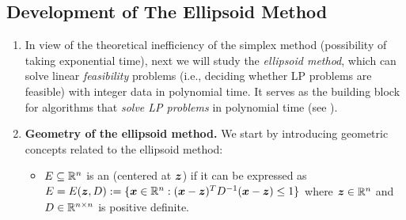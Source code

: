 \subsection{Development of The Ellipsoid Method}
\begin{enumerate}
\item In view of the theoretical inefficiency of the simplex method
(possibility of taking exponential time), next we will study the
\emph{ellipsoid method}, which can solve linear \emph{feasibility} problems
(i.e., deciding whether LP problems are feasible) with integer data in
polynomial time. It serves as the building block for algorithms that
\emph{solve LP problems} in polynomial time (see ).

\item\label{it:ellip-method-geo} \textbf{Geometry of the ellipsoid method.} We start by introducing
geometric concepts related to the ellipsoid method:
\begin{itemize}
\item \(E\subseteq \mathbb{R}^n\) is an  (centered at \(\bm{z}\)) if it can be expressed as
\(E=E(\bm{z},D):=\{\bm{x}\in\mathbb{R}^n:(\bm{x}-\bm{z})^{T}D^{-1}(\bm{x}-\bm{z})\le 1\}\)
where \(\bm{z}\in\mathbb{R}^n\) and \(D\in\mathbb{R}^{n\times n}\) is positive definite.
\begin{center}
\end{center}

\end{itemize}
\end{enumerate}
